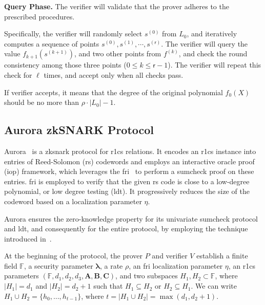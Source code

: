 \noindent\textbf{Query Phase.}
The verifier will validate that the prover adheres to the prescribed procedures.

Specifically, the verifier will randomly select $s^{(0)}$ from $L_0$, and iteratively computes a sequence of points $s^{(0)}, s^{(1)}, \cdots , s^{(\mathsf{r})}$. The verifier will query the value $f_{k+1}(s^{(k+1)})$, and two other points from $f^{(k)}$, and check the round consistency among those three points ($0\le k\le \mathsf{r} -1$). The verifier will repeat this check for $\ell$ times, and accept only when all checks pass.

If verifier accepts, it means that the degree of the original polynomial $f_0(X)$ should be no more than $\rho\cdot |L_{0}| -1$.


\subsection{Aurora zkSNARK Protocol}\label{sec:prel_aurora}


Aurora~\cite{Aurora2019} is a \gls{zksnark} protocol for \gls{r1cs} relations. It encodes an \gls{r1cs} instance into entries of Reed-Solomon (\gls{rs}) codewords and employs an interactive oracle proof (\gls{iop}) framework, which leverages the \gls{fri}~\cite{FRI2018} to perform a sumcheck proof on these entries. \gls{fri} is employed to verify that the given \gls{rs} code is close to a low-degree polynomial, or low degree testing (\gls{ldt}). It progressively reduces the size of the codeword based on a localization parameter $\eta$.

Aurora ensures the zero-knowledge property for its univariate sumcheck protocol and \gls{ldt}, and consequently for the entire protocol, by employing the technique introduced in~\cite{Ben-Sasson2016Zero-Knowledge}.

At the beginning of the protocol, the prover $P$ and verifier $V$ establish a finite field \( \mathbb{F} \), a security parameter $\boldsymbol{\lambda}$, a rate $\rho$, an \gls{fri} localization parameter $\eta$, an \gls{r1cs} parameters
\(
(\mathbb{F}, d_1, d_2, d_3, \mathbf{A}, \mathbf{B}, \mathbf{C})
\),
 and two subspaces \( H_1, H_2 \subset \mathbb{F} \), where \( |H_1| = d_1 \) and \( |H_2| = d_2 + 1 \) such that $H_1 \subseteq H_2$ or $H_2 \subseteq H_1$. We can write $H_1 \cup H_2 = \{h_0, \dots, h_{t-1}\}$, where $t = |H_1 \cup H_2| = \max(d_1, d_2+1)$. 

